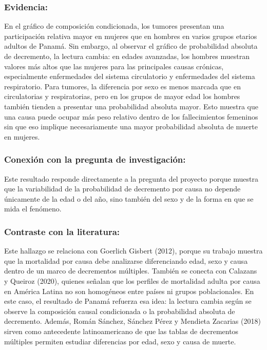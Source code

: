 \documentclass[
  spanish,
  letterpaper,
  DIV=11,
  numbers=noendperiod]{scrartcl}
\begin{document}
\subsubsection{Evidencia:}\label{evidencia-3}

En el gráfico de composición condicionada, los tumores presentan una
participación relativa mayor en mujeres que en hombres en varios grupos
etarios adultos de Panamá. Sin embargo, al observar el gráfico de
probabilidad absoluta de decremento, la lectura cambia: en edades
avanzadas, los hombres muestran valores más altos que las mujeres para
las principales causas crónicas, especialmente enfermedades del sistema
circulatorio y enfermedades del sistema respiratorio. Para tumores, la
diferencia por sexo es menos marcada que en circulatorias y
respiratorias, pero en los grupos de mayor edad los hombres también
tienden a presentar una probabilidad absoluta mayor. Esto muestra que
una causa puede ocupar más peso relativo dentro de los fallecimientos
femeninos sin que eso implique necesariamente una mayor probabilidad
absoluta de muerte en mujeres.

\subsubsection{Conexión con la pregunta de
investigación:}\label{conexiuxf3n-con-la-pregunta-de-investigaciuxf3n-1}

Este resultado responde directamente a la pregunta del proyecto porque
muestra que la variabilidad de la probabilidad de decremento por causa
no depende únicamente de la edad o del año, sino también del sexo y de
la forma en que se mida el fenómeno.

\subsubsection{Contraste con la
literatura:}\label{contraste-con-la-literatura-3}

Este hallazgo se relaciona con Goerlich Gisbert (2012), porque su
trabajo muestra que la mortalidad por causa debe analizarse
diferenciando edad, sexo y causa dentro de un marco de decrementos
múltiples. También se conecta con Calazans y Queiroz (2020), quienes
señalan que los perfiles de mortalidad adulta por causa en América
Latina no son homogéneos entre países ni grupos poblacionales. En este
caso, el resultado de Panamá refuerza esa idea: la lectura cambia según
se observe la composición causal condicionada o la probabilidad absoluta
de decremento. Además, Román Sánchez, Sánchez Pérez y Mendieta Zacarias
(2018) sirven como antecedente latinoamericano de que las tablas de
decrementos múltiples permiten estudiar diferencias por edad, sexo y
causa de muerte.
\end{document}

